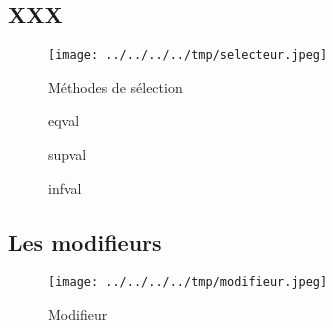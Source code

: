 \subsection{XXX}

\begin{figure}
  \centering
  \texttt{[image: ../../../../tmp/selecteur.jpeg]}
  \caption{Méthodes de sélection}
  \label{fig:methode_selecteur}
\end{figure}






\begin{figure}
  \centering
  
  \caption{eqval}
  \label{fig:select_eqval}
\end{figure}


\begin{figure}
  \centering
  
  \caption{supval}
  \label{fig:select_supval}
\end{figure}


\begin{figure}
  \centering
  
  \caption{infval}
  \label{fig:select_infval}
\end{figure}

\subsection{Les modifieurs}



\begin{figure}
  \centering
  \texttt{[image: ../../../../tmp/modifieur.jpeg]}
  \caption{Modifieur}
  \label{fig:methode_modifieur}
\end{figure}



